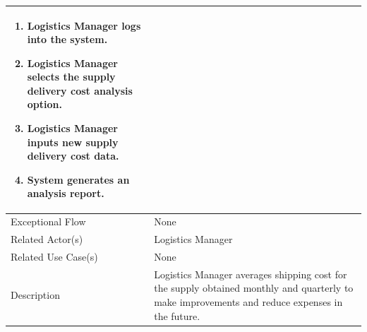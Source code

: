 \begin{center}
\begin{tabularx}{\textwidth}{|l|X|}
\begin{enumerate}[left=0pt]
			\item Logistics Manager logs into the system.
			\item Logistics Manager  selects the supply delivery cost analysis option.
			\item Logistics Manager  inputs new supply delivery cost data.
			\item System generates an analysis report.
		\end{enumerate} \\
		\hline
		Exceptional Flow & None \\
		\hline
		Related Actor(s) & Logistics Manager \\
		\hline
		Related Use Case(s) & None \\
		\hline
		Description & Logistics Manager averages shipping cost for the supply obtained monthly and quarterly to make improvements and reduce expenses in the future. \\
		\hline
	\end{tabularx}
\end{center}

